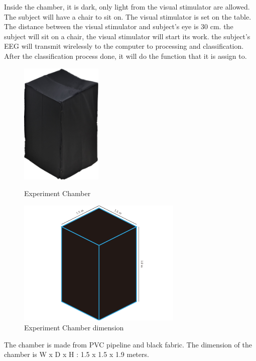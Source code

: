 Inside the chamber, it is dark, only light from the visual stimulator are allowed. The subject will have a chair to sit on. The visual stimulator is set on the table. The distance between the visual stimulator and subject's eye is 30 cm. the subject will sit on a chair, the visual stimulator will start its work. the subject's EEG will transmit wirelessly to the computer to processing and classification. After the classification process done, it will do the function that it is assign to. \newpage
\begin{figure}[H]
	\centering
	\includegraphics[width=0.35\textwidth]{chapter6/blackbox.jpg}
	\caption{Experiment Chamber}
	\vspace{1.5cm}
	\includegraphics[width=0.7\textwidth]{chapter6/dark_wire.pdf}
	\caption{Experiment Chamber dimension}
\end{figure}
\hspace{1.5cm}The chamber is made from PVC pipeline and black fabric. The dimension of the chamber is W x D x H : 1.5 x 1.5 x 1.9 meters.\\


